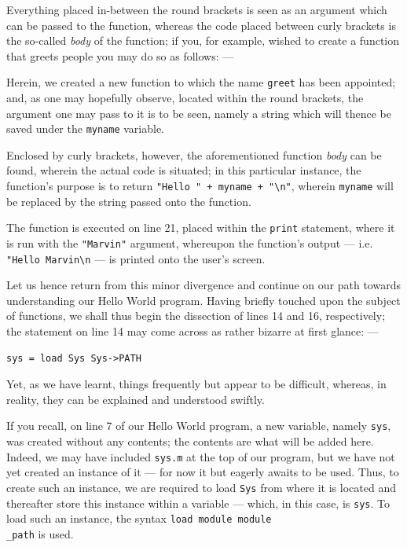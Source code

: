 \documentclass[a5paper,twoside,12pt]{report}
\begin{document}
Everything placed in-between the round brackets is seen as an argument which can be passed to the function, whereas the code placed between curly brackets is the so-called \textit{body} of the function; if you, for example, wished to create a function that greets people you may do so as follows: —



Herein, we created a new function to which the name \texttt{greet} has been appointed; and, as one may hopefully observe, located within the round brackets, the argument one may pass to it is to be seen, namely a string which will thence be saved under the \texttt{myname} variable.

Enclosed by curly brackets, however, the aforementioned function \textit{body} can be found, wherein the actual code is situated; in this particular instance, the function's purpose is to return \texttt{"Hello " + myname + "\textbackslash n"}, wherein \texttt{myname} will be replaced by the string passed onto the function.

The function is executed on line 21, placed within the \texttt{print} statement, where it is run with the \texttt{"Marvin"} argument, whereupon the function's output — i.e. \texttt{"Hello Marvin\textbackslash n} — is printed onto the user's screen.

Let us hence return from this minor divergence and continue on our path towards understanding our Hello World program. Having briefly touched upon the subject of functions, we shall thus begin the dissection of lines 14 and 16, respectively; the statement on line 14 may come across as rather bizarre at first glance: —

\begin{lstlisting}
sys = load Sys Sys->PATH
\end{lstlisting}

Yet, as we have learnt, things frequently but appear to be difficult, whereas, in reality, they can be explained and understood swiftly. 

If you recall, on line 7 of our Hello World program, a new variable, namely \texttt{sys}, was created without any contents; the contents are what will be added here. Indeed, we may have included \texttt{sys.m} at the top of our program, but we have not yet created an instance of it — for now it but eagerly awaits to be used. Thus, to create such an instance, we are required to load \texttt{Sys} from where it is located and thereafter store this instance within a variable — which, in this case, is \texttt{sys}. To load such an instance, the syntax \texttt{load module module\\\_path} is used.
\end{document}
